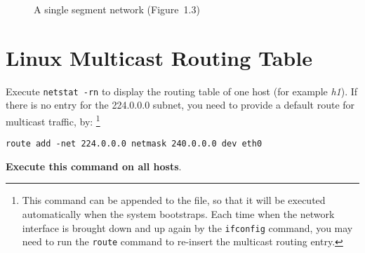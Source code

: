 \documentclass{../UTNetLab}
\begin{document}
    \begin{minipage}{0.48\textwidth}
        \begin{flushright}
            \begin{figure}[H]
                \centering
                \caption{A single segment network (Figure~1.3)}
                \label{fig:1.3}
            \end{figure}
        \end{flushright}
    \end{minipage}

\section{Linux Multicast Routing Table}
\label{sec:linux-multicast-routing}
    Execute \lstinline{netstat -rn} to display the routing table of one host (for example \textit{h1}).
    If there is no entry for the 224.0.0.0 subnet, you need to provide a default route for multicast traffic, by:
    \footnote{This command can be appended to the  file, so that it will be executed automatically when the system bootstraps.
    Each time when the network interface is brought down and up again by the \lstinline{ifconfig} command, you may need to run the \lstinline{route} command to re-insert the multicast routing entry.}
    \begin{lstlisting}[emph=eth0]
route add -net 224.0.0.0 netmask 240.0.0.0 dev eth0
    \end{lstlisting}
    \textbf{Execute this command on all hosts}.
\end{document}
